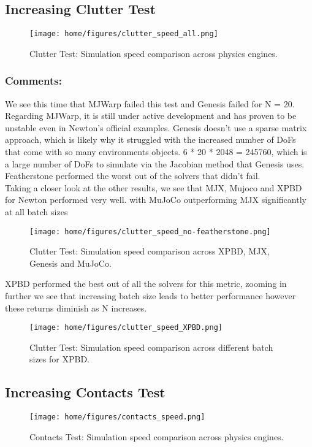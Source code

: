 \documentclass[11pt,a4paper]{article}
\begin{document}
\subsection{Increasing Clutter Test}
\begin{figure}[H]
    \centering
    \texttt{[image: home/figures/clutter\_speed\_all.png]}
    \caption{Clutter Test: Simulation speed comparison across physics engines.}
    \label{fig:clutter_speed_comparison}
\end{figure}


\subsubsection{Comments:} We see this time that MJWarp failed this test and Genesis failed for N = 20. Regarding MJWarp, it is still under active development and has proven to be unstable even in Newton's official examples.
Genesis doesn't use a sparse matrix approach, which is likely why it struggled with the increased number of DoFs that come with so many environments objects. 6 * 20 * 2048 = 245760, which is a large number of DoFs to simulate via the Jacobian method that Genesis uses. \\
Featherstone performed the worst out of the solvers that didn't fail. \\
Taking a closer look at the other results, we see that MJX, Mujoco and XPBD for Newton performed very well. with MuJoCo outperforming MJX significantly at all batch sizes
\begin{figure}[H]
    \centering
    \texttt{[image: home/figures/clutter\_speed\_no-featherstone.png]}
    \caption{Clutter Test: Simulation speed comparison across XPBD, MJX, Genesis and MuJoCo.}
    \label{fig:clutter_speed_comparison}
\end{figure}
\noindent XPBD performed the best out of all the solvers for this metric, zooming in further we see that increasing batch size leads to better performance however these returns diminish as N increases.
\begin{figure}[H]
    \centering
    \texttt{[image: home/figures/clutter\_speed\_XPBD.png]}
    \caption{Clutter Test: Simulation speed comparison across different batch sizes for XPBD.}
    \label{fig:clutter_speed_comparison}
\end{figure}

\subsection{Increasing Contacts Test}
\begin{figure}[H]
    \centering
    \texttt{[image: home/figures/contacts\_speed.png]}
    \caption{Contacts Test: Simulation speed comparison across physics engines.}
    \label{fig:contacts_speed_comparison}
\end{figure}
\end{document}
